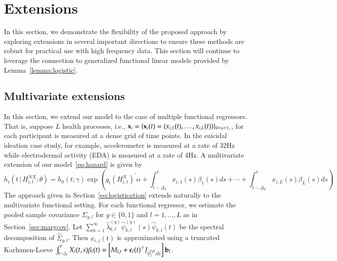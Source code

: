 \documentclass[12pt]{amsart}
\def\given{\, | \,}
\def\bfx{{\bf x}}
\begin{document}



\section{Extensions}
\label{section:extensions}

In this section, we demonstrate the flexibility of the proposed approach by exploring extensions in several important directions to ensure these methods are robust for practical use with high frequency data. This section will continue to leverage the connection to generalized functional linear models provided by Lemma~\ref{lemma:logistic}.

\subsection{Multivariate extensions}
\label{section:multiplesensors}

In this section, we extend our model to the case of multiple functional regressors.  That is, suppose $L$ health processes, i.e., $\bfx_i = \{ \bfx_i (t) = (x_{i,1} (t), \ldots, x_{i,L} (t)) \}_{0 < s < \tau_i}$, for each participant is measured at a dense grid of time points. In the suicidal ideation case study, for example, accelerometer is measured at a rate of 32Hz while electrodermal activity (EDA) is measured at a rate of 4Hz.  A multivariate extension of our model~\eqref{eq:hazard} is given by
\begin{equation}
\label{eq:multihazardlinear}
h_i \left( t \given  H_{i,t}^{NX} ; \theta \right) =
h_0 (t; \gamma) \exp \left( g_t \left( H_{i,t}^{N} \right)^{\prime} \alpha
  + \int_{t-\Delta_1}^t x_{i,1} (s) \beta_1(s) ds + \cdots + \int_{t-\Delta_L}^t x_{i,L} (s) \beta_L(s) ds  \right)
\end{equation}
The approach given in Section~\ref{eq:logistication} extends naturally to the multivariate functional setting. For each functional regressor, we estimate the pooled sample covariance $\Sigma_{y,l}$ for $y \in \{0,1\}$ and $l=1,\ldots,L$ as in Section~\ref{sec:margcov}.  Let $\sum_{k=1}^\infty \hat \lambda^{(y)}_{k,l} \hat \psi^{(y)}_{k,l} (s) \hat \psi_{k,l}(t)$ be the spectral decomposition of $\hat \Sigma_{y,l}$.  Then $x_{i,j}(t)$ is approximated using a truncated Karhunen-Loeve $\int_{t-\Delta_l}^t X_{l} (t,s) \beta_l(t) = \left[M_{l,t} + {\bf c}_l (t)^\top J_{\hat \psi_l^{(y)}, \phi_l} \right] {\bf b}_l$.
\end{document}
